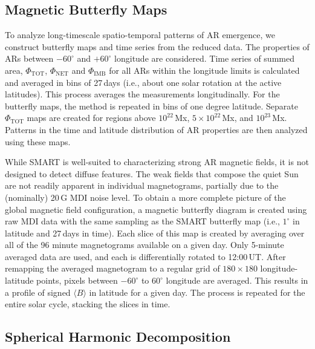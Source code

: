 \documentclass[namedreferences]{solarphysics}
\begin{document}
\begin{article}
\subsection{Magnetic Butterfly Maps}\label{sub:magbutt}

To analyze long-timescale spatio-temporal patterns of AR emergence, we construct butterfly maps and time series from the reduced data. The properties of ARs between $-60^\circ$ and $+60^\circ$ longitude are considered. Time series of summed area, $\Phi_{\mathrm{TOT}}$, $\Phi_{\mathrm{NET}}$ and $\Phi_{\mathrm{IMB}}$ for all ARs within the longitude limits is calculated and averaged in bins of 27\,days (i.e., about one solar rotation at the active latitudes). This process averages the measurements longitudinally. 
For the butterfly maps, the method is repeated in bins of one degree latitude. Separate $\Phi_{\mathrm{TOT}}$ maps are created for regions above $10^{22}$\,Mx, $5\times10^{22}$\,Mx, and $10^{23}$\,Mx. Patterns in the time and latitude distribution of AR properties are then analyzed using these maps.


While SMART is well-suited to characterizing strong AR magnetic fields, it is not designed to detect diffuse features. The weak fields that compose the quiet Sun are not readily apparent in individual magnetograms, partially due to the (nominally) 20\,G MDI noise level. To obtain a more complete picture of the global magnetic field configuration, a magnetic butterfly diagram is created using raw MDI data with the same sampling as the SMART butterfly map (i.e., $1^\circ$ in latitude and 27\,days in time). Each slice of this map is created by averaging over all of the 96 minute magnetograms available on a given day. Only 5-minute averaged data are used, and each is differentially rotated to 12:00\,UT. After remapping the averaged magnetogram to a regular grid of $180\times180$ longitude-latitude points, pixels between $-60^{\circ}$ to $60^{\circ}$ longitude are averaged. This results in a profile of signed $\langle {B} \rangle$ in latitude for a given day. The process is repeated for the entire solar cycle, stacking the slices in time. 


\subsection{Spherical Harmonic Decomposition}\label{sub:sphharm}


\end{article}
\end{document}

